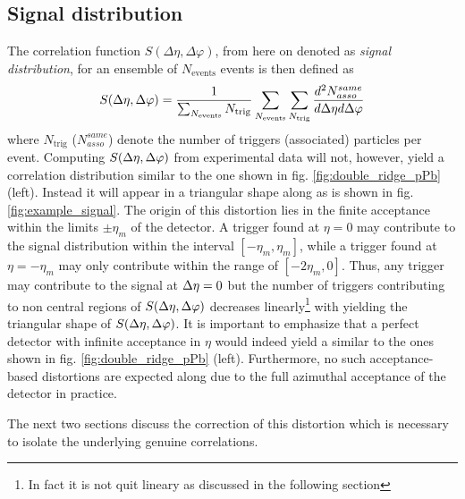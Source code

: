\subsection{Signal distribution}
\label{sec:signal_distribution}
The correlation function $S(\Delta\eta, \Delta\varphi)$, from here on denoted as \emph{signal distribution}, for an ensemble of $N_{\text{events}}$ events is then defined as
\begin{equation}
  \label{eq:signal}
  S(\Delta\eta, \Delta\varphi) = \frac{1}{\sum_{N_{\text{events}}} N_{\text{trig}}}
  \sum_{N_{\text{events}}} 
  \sum_{N_{\text{trig}}}
  \frac{d^2N_{asso}^{same}}{d\Delta\eta d\Delta\varphi}
\end{equation}
where $N_\text{trig}$ ($N_{asso}^{same}$) denote the number of triggers (associated) particles per event. Computing $S(\Delta\eta, \Delta\varphi)$ from experimental data will not, however, yield a correlation distribution similar to the one shown in fig. \ref{fig:double_ridge_pPb} (left). Instead it will appear in a triangular shape along \deta as is shown in fig. \ref{fig:example_signal}. The origin of this distortion lies in the finite acceptance within the limits $\pm\eta_m$ of the detector. A trigger found at $\eta = 0$ may contribute to the signal distribution within the \deta interval $\left[-\eta_m, \eta_m\right]$, while a trigger found at $\eta = -\eta_m$ may only contribute within the range of $\left[-2\eta_m, 0\right]$. Thus, any trigger may contribute to the signal at $\Delta\eta = 0$ but the number of triggers contributing to non central regions of $S(\Delta\eta, \Delta\varphi)$ decreases linearly\footnote{In fact it is not quit lineary as discussed in the following section} with \deta yielding the triangular shape of $S(\Delta\eta, \Delta\varphi)$. It is important to emphasize that a perfect detector with infinite acceptance in $\eta$  would indeed yield a \Sig similar to the ones shown in fig. \ref{fig:double_ridge_pPb} (left). Furthermore,  no such acceptance-based distortions are expected along \dphi due to the full azimuthal acceptance of the detector in practice.

The next two sections discuss the correction of this distortion  which is necessary to isolate the underlying genuine correlations.


